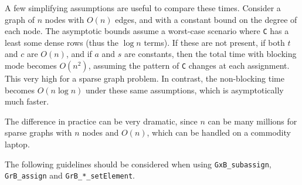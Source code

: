 \documentclass[12pt]{article}
\begin{document}
A few simplifying assumptions are useful to compare these times.  Consider a
graph of $n$ nodes with $O(n)$ edges, and with a constant bound on the degree
of each node.  The asymptotic bounds assume a worst-case scenario where
\verb'C' has a least some dense rows (thus the $\log n$ terms).  If these
are not present, if both $t$ and $c$ are $O(n)$, and if $a$ and $s$ are
constants, then the total time with blocking mode becomes $O(n^2)$, assuming
the pattern of \verb'C' changes at each assignment.  This very high for a
sparse graph problem.  In contrast, the non-blocking time becomes $O(n \log n)$
under these same assumptions, which is asymptotically much faster.

\newpage
The difference in practice can be very dramatic, since $n$ can be many millions
for sparse graphs with $n$ nodes and $O(n)$, which can be handled on a
commodity laptop.

The following guidelines should be considered when using
\verb'GxB_subassign', \verb'GrB_assign' and \verb'GrB_*_setElement'.
\end{document}
